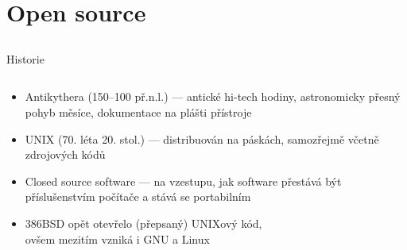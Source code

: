 \documentclass{beamer}
\begin{document}
\section{Open source}

\subsection{}
\begin{frame}{Historie}
\begin{columns}
\begin{column}{9cm}
\begin{itemize}
\item Antikythera (150--100 př.n.l.) --- antické hi-tech hodiny, astronomicky přesný pohyb měsíce, dokumentace na plášti přístroje
\item UNIX (70. léta 20. stol.) --- distribuován na páskách, samozřejmě včetně zdrojových kódů
\item Closed source software --- na vzestupu, jak software přestává být příslušenstvím počítače a stává se portabilním
\item 386BSD opět otevřelo (přepsaný) UNIXový kód,\\ovšem mezitím vzniká i GNU a Linux
\end{itemize}
\end{column}
\end{columns}
\end{frame}
\end{document}
